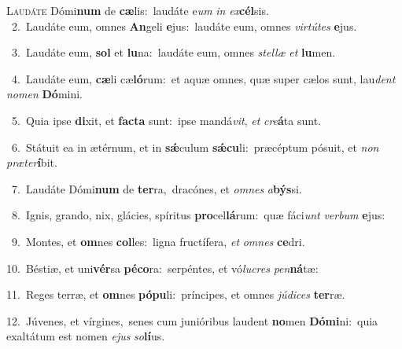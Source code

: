 \lettrine{\initial\textcolor{\initialcolor}{L}}{audáte} Dómi\textbf{num} de \textbf{cæ}\-lis:~\star laudáte e\textit{um} \textit{in} \textit{ex}\-\textbf{cél}sis.\\
{\numbfont\textcolor{\numbcolor}{~2.}}~Laudáte eum, omnes \textbf{An}\-geli \textbf{e}\-jus:~\star laudáte eum, omnes \textit{vir}\-\textit{tú}\textit{tes} \textbf{e}\-jus.\par
{\numbfont\textcolor{\numbcolor}{~3.}}~Laudáte eum, \textbf{sol} et \textbf{lu}\-na:~\star laudáte eum, omnes \textit{stel}\-\textit{læ} \textit{et} \textbf{lu}\-men.\par
{\numbfont\textcolor{\numbcolor}{~4.}}~Laudáte eum, \textbf{cæ}\-li cæ\-\textbf{ló}\-rum:~\star et aquæ omnes, quæ super cælos sunt, lau\textit{dent} \textit{no}\-\textit{men} \textbf{Dó}\-mini.\par
{\numbfont\textcolor{\numbcolor}{~5.}}~Quia ipse \textbf{di}\-xit, et \textbf{fac}\-\textbf{ta} sunt:~\star ipse mandá\-\textit{vit}\-, \textit{et} \textit{cre}\-\textbf{á}ta sunt.\par
{\numbfont\textcolor{\numbcolor}{~6.}}~Státuit ea in ætérnum, et in \textbf{sǽ}\-culum \textbf{sǽ}\-\textbf{cu}li:~\star præcéptum pósuit, et \textit{non} \textit{præ}\-\textit{ter}\textbf{í}bit.\par
{\numbfont\textcolor{\numbcolor}{~7.}}~Laudáte Dómi\textbf{num} de \textbf{ter}\-ra,~\star dracónes, et \textit{om}\-\textit{nes} \textit{a}\-\textbf{býs}si.\par
{\numbfont\textcolor{\numbcolor}{~8.}}~Ignis, grando, nix, glácies, spíritus \textbf{pro}\-cel\-\textbf{lá}\-rum:~\star quæ fáci\textit{unt} \textit{ver}\-\textit{bum} \textbf{e}\-jus:\par
{\numbfont\textcolor{\numbcolor}{~9.}}~Montes, et \textbf{om}\-nes \textbf{col}\-les:~\star ligna fructífera, \textit{et} \textit{om}\-\textit{nes} \textbf{ce}\-dri.\par
{\numbfont\textcolor{\numbcolor}{10.}}~Béstiæ, et uni\-\textbf{vér}\-sa \textbf{pé}\-\textbf{co}ra:~\star serpéntes, et vó\-\textit{lu}\-\textit{cres} \textit{pen}\-\textbf{ná}tæ:\par
{\numbfont\textcolor{\numbcolor}{11.}}~Reges terræ, et \textbf{om}\-nes \textbf{pó}\-\textbf{pu}li:~\star príncipes, et omnes \textit{jú}\-\textit{di}\textit{ces} \textbf{ter}\-ræ.\par
{\numbfont\textcolor{\numbcolor}{12.}}~Júvenes, et vírgines,~\dagger senes cum junióribus laudent \textbf{no}\-men \textbf{Dó}\-\textbf{mi}ni:~\star quia exaltátum est nomen \textit{e}\-\textit{jus} \textit{so}\-\textbf{lí}us.\par
